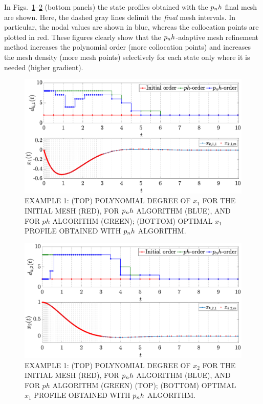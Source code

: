 In Figs.~\ref{fig:pnh1vanderpol}--\ref{fig:pnh2vanderpol} (bottom panels) the state profiles obtained with the $p_{n}h$ final mesh are shown. Here, the dashed gray lines delimit the \emph{final} mesh intervals. In particular, the nodal values are shown in blue, whereas the collocation points are plotted in red. These figures clearly show that the $p_{n}h$-adaptive mesh refinement method increases the polynomial order (more collocation points) and increases the mesh density (more mesh points) selectively for each state only where it is needed (higher gradient).
\begin{figure}[t]
	\centering
	\includegraphics[trim={1cm 0.1cm 2cm 0.5cm},clip,width=1\columnwidth]{Img/pnh1_vanderpol1}
	\caption{EXAMPLE 1:  (TOP) POLYNOMIAL DEGREE OF $x_{1}$ FOR THE INITIAL MESH (RED), FOR $p_{n}h$ ALGORITHM (BLUE), AND FOR $ph$ ALGORITHM (GREEN); (BOTTOM)
	OPTIMAL $x_1$ PROFILE OBTAINED WITH $p_{n}h$ ALGORITHM.}
	\label{fig:pnh1vanderpol}
\end{figure}
\begin{figure}[t]
	\centering
	\includegraphics[trim={1cm 0.1cm 2cm 0.5cm},clip,width=1\columnwidth]{Img/pnh2_vanderpol2}
	\caption{EXAMPLE 1: (TOP) POLYNOMIAL DEGREE OF $x_{2}$ FOR THE INITIAL MESH (RED), FOR $p_{n}h$ ALGORITHM (BLUE), AND FOR $ph$ ALGORITHM (GREEN) (TOP); (BOTTOM)
	OPTIMAL $x_1$ PROFILE OBTAINED WITH $p_{n}h$ ALGORITHM.}
	\label{fig:pnh2vanderpol}
\end{figure}
